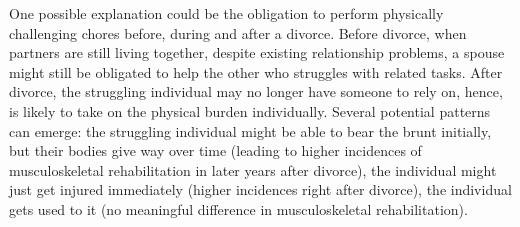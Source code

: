 \documentclass[a4paper,12pt]{article}
\theoremstyle{plain}
\theoremstyle{definition}
\theoremstyle{TheoremNum}
\theoremstyle{CorollaryNum}
\theoremstyle{PropositionNum}
\theoremstyle{TheoremNum}
\begin{document}
One possible explanation could be the obligation to perform physically challenging chores before, during and after a divorce. Before divorce, when partners are still living together, despite existing relationship problems, a spouse might still be obligated to help the other who struggles with related tasks. After divorce, the struggling individual may no longer have someone to rely on, hence, is likely to take on the physical burden individually. Several potential patterns can emerge: the struggling individual might be able to bear the brunt initially, but their bodies give way over time (leading to higher incidences of musculoskeletal rehabilitation in later years after divorce), the individual might just get injured immediately (higher incidences right after divorce), the individual gets used to it (no meaningful difference in musculoskeletal rehabilitation). 
\end{document}
